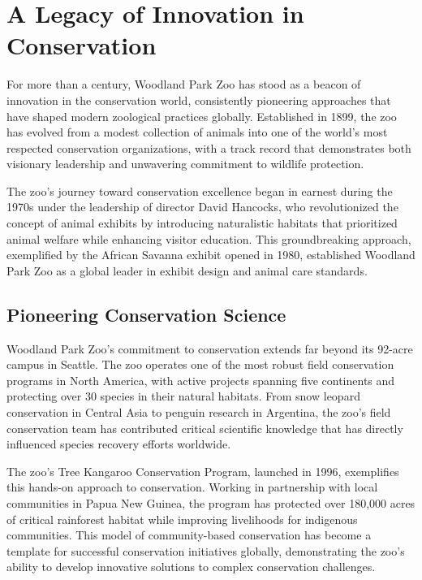 \documentclass[
  Letterpaper,
]{scrbook}
\begin{document}
\hfill\break

\section{A Legacy of Innovation in
Conservation}\label{a-legacy-of-innovation-in-conservation}

For more than a century, Woodland Park Zoo has stood as a beacon of
innovation in the conservation world, consistently pioneering approaches
that have shaped modern zoological practices globally. Established in
1899, the zoo has evolved from a modest collection of animals into one
of the world's most respected conservation organizations, with a track
record that demonstrates both visionary leadership and unwavering
commitment to wildlife protection.

The zoo's journey toward conservation excellence began in earnest during
the 1970s under the leadership of director David Hancocks, who
revolutionized the concept of animal exhibits by introducing
naturalistic habitats that prioritized animal welfare while enhancing
visitor education. This groundbreaking approach, exemplified by the
African Savanna exhibit opened in 1980, established Woodland Park Zoo as
a global leader in exhibit design and animal care standards.

\subsection{Pioneering Conservation
Science}\label{pioneering-conservation-science}

Woodland Park Zoo's commitment to conservation extends far beyond its
92-acre campus in Seattle. The zoo operates one of the most robust field
conservation programs in North America, with active projects spanning
five continents and protecting over 30 species in their natural
habitats. From snow leopard conservation in Central Asia to penguin
research in Argentina, the zoo's field conservation team has contributed
critical scientific knowledge that has directly influenced species
recovery efforts worldwide.

The zoo's Tree Kangaroo Conservation Program, launched in 1996,
exemplifies this hands-on approach to conservation. Working in
partnership with local communities in Papua New Guinea, the program has
protected over 180,000 acres of critical rainforest habitat while
improving livelihoods for indigenous communities. This model of
community-based conservation has become a template for successful
conservation initiatives globally, demonstrating the zoo's ability to
develop innovative solutions to complex conservation challenges.
\end{document}
